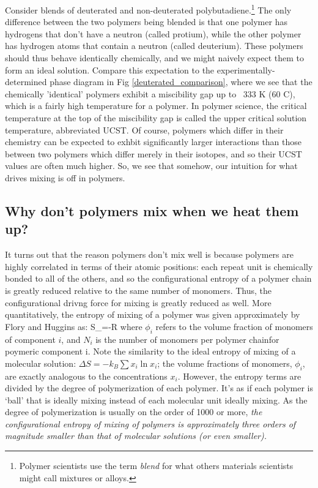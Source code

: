 \documentclass[12pt]{article}
\begin{document}
Consider blends of deuterated and non-deuterated polybutadiene.\footnote{Polymer scientists use the term \emph{blend} for what others materials scientists might call mixtures or alloys.} The only difference between  the two polymers being blended is that one polymer has hydrogens that don't have a neutron (called protium), while the other polymer has hydrogen atoms that contain a neutron (called deuterium). These polymers should thus behave identically chemically, and we might naively expect them to form an ideal solution.  Compare this expectation to the experimentally-determined phase diagram in Fig \ref{deuterated_comparison}, where we see that the chemically 'identical' polymers exhibit a miscibility gap up to ~333 K (60 \degree C), which is a fairly high temperature for a polymer. In polymer science, the critical temperature at the top of the miscibility gap is called the upper critical solution temperature, abbreviated UCST. Of course, polymers which differ in their chemistry can be expected to exhbit significantly larger interactions than those between two polymers which differ merely in their isotopes, and so their UCST values are often much higher. So, we see that somehow, our intuition for what drives mixing is off in polymers.

\subsection{Why don't polymers mix when we heat them up?}
It turns out that the reason polymers don't mix well is because polymers are highly correlated in terms of their atomic positions: each repeat unit is chemically bonded to all of the others, and so the configurational entropy of a polymer chain is greatly reduced relative to the same number of monomers. Thus, the configurational drivng force for mixing is greatly reduced as well. More quantitatively, the entropy of mixing of a polymer was given approximately by Flory and Huggins as:
\eqs
\Delta S_=-R
\eqe
where $\phi_i$ refers to the volume fraction of monomers of component $i$, and $N_i$ is the number of monomers per polymer chainfor poymeric component i. Note the similarity to the ideal entropy of mixing of a molecular solution: $\Delta S=-k_B\sum x_i \ln x_i $; the volume fractions of monomers, $\phi_i$, are exactly analogous to the concentrations $x_i$. However, the entropy terms are divided by the degree of polymerization of each polymer. It's as if each polymer is `ball' that is ideally mixing instead of each molecular unit ideally mixing. As the degree of polymerization is usually on the order of 1000 or more, \emph{the configurational entropy of mixing of polymers is approximately three orders of magnitude smaller than that of molecular solutions (or even smaller).} 
 
\end{document}
